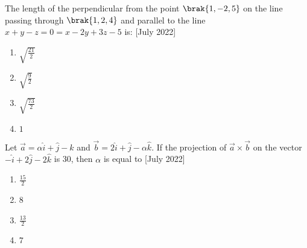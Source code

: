         \item The length of the perpendicular from the point $\brak{1,-2,5}$ on the line passing through $\brak{1,2,4}$ and parallel to the line $x+y-z = 0 = x-2y+3z-5$ is: \hfill{[July 2022]}
        \begin{multicols}{2}
            \begin{enumerate}
                \item $\sqrt{\frac{21}{2}}$
                \item $\sqrt{\frac{9}{2}}$
                \item $\sqrt{\frac{73}{2}}$
                \item $1$
            \end{enumerate}
        \end{multicols}
       \item  Let $\vec{a}=\alpha \hat{i} + \hat{j} - \hat{k}$ and $\vec{b} = 2\hat{i}+\hat{j}-\alpha\hat{k}$. If the projection of $\vec{a} \times \vec{b}$ on the vector $-\hat{i}+2\hat{j}-2\hat{k}$ is 30, then $\alpha$ is equal to \hfill{[July 2022]}
       \begin{multicols}{2}
           \begin{enumerate}
               \item $\frac{15}{2}$
               \item 8
               \item $\frac{13}{2}$
               \item $7$
           \end{enumerate}
       \end{multicols}
    

